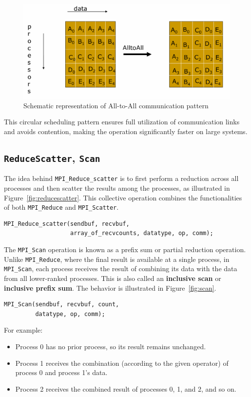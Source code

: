\documentclass[12pt]{book}
\begin{document}
\begin{figure}[H]
    \centering
    \includegraphics[width=0.65\linewidth]{images/alltoall.png}
    \caption{Schematic representation of All-to-All communication pattern}
    \label{fig:alltoall}
\end{figure}

This circular scheduling pattern ensures full utilization of communication links and avoids contention, making the operation significantly faster on large systems.
\subsection{\texttt{ReduceScatter}, \texttt{Scan}}

The idea behind \texttt{MPI\_Reduce\_scatter} is to first perform a reduction across all processes and then scatter the results among the processes, as illustrated in Figure~\ref{fig:reducescatter}. This collective operation combines the functionalities of both \texttt{MPI\_Reduce} and \texttt{MPI\_Scatter}.

\begin{lstlisting}[style=cppstyle]
MPI_Reduce_scatter(sendbuf, recvbuf,
                   array_of_recvcounts, datatype, op, comm);
\end{lstlisting}

The \texttt{MPI\_Scan} operation is known as a prefix sum or partial reduction operation. Unlike \texttt{MPI\_Reduce}, where the final result is available at a single process, in \texttt{MPI\_Scan}, each process receives the result of combining its data with the data from all lower-ranked processes. This is also called an \textbf{inclusive scan} or \textbf{inclusive prefix sum}. The behavior is illustrated in Figure~\ref{fig:scan}.

\begin{lstlisting}[style=cppstyle]
MPI_Scan(sendbuf, recvbuf, count,
         datatype, op, comm);
\end{lstlisting}

For example:
\begin{itemize}
    \item Process 0 has no prior process, so its result remains unchanged.
    \item Process 1 receives the combination (according to the given operator) of process 0 and process 1's data.
    \item Process 2 receives the combined result of processes 0, 1, and 2, and so on.
\end{itemize}
\end{document}
